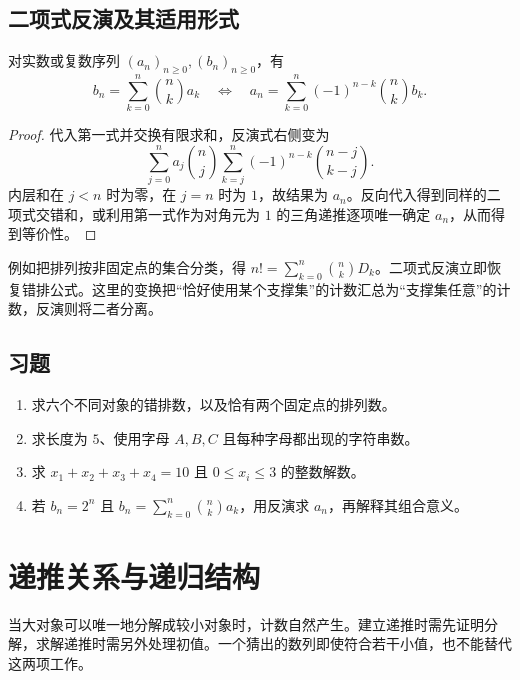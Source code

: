 \documentclass[UTF8,12pt,a4paper,fontset=fandol]{ctexbook}
\begin{document}
\section{二项式反演及其适用形式}

\begin{theorem}
对实数或复数序列 $(a_n)_{n\ge0},(b_n)_{n\ge0}$，有
\begin{equation}
  b_n=\sum_{k=0}^n\binom nk a_k
  \quad\Longleftrightarrow\quad
  a_n=\sum_{k=0}^n(-1)^{n-k}\binom nk b_k.
  \label{eq:binomial-inversion}
\end{equation}
\end{theorem}
\begin{proof}
代入第一式并交换有限求和，反演式右侧变为
\[
 \sum_{j=0}^n a_j\binom nj
 \sum_{k=j}^n(-1)^{n-k}\binom{n-j}{k-j}.
\]
内层和在 $j<n$ 时为零，在 $j=n$ 时为 $1$，故结果为 $a_n$。反向代入得到同样的二项式交错和，或利用第一式作为对角元为 $1$ 的三角递推逐项唯一确定 $a_n$，从而得到等价性。
\end{proof}

例如把排列按非固定点的集合分类，得 $n!=\sum_{k=0}^n\binom nkD_k$。二项式反演立即恢复错排公式。这里的变换把“恰好使用某个支撑集”的计数汇总为“支撑集任意”的计数，反演则将二者分离。

\section{习题}
\begin{enumerate}
  \item\label{ex:inclusion-exclusion-1} 求六个不同对象的错排数，以及恰有两个固定点的排列数。
  \item\label{ex:inclusion-exclusion-2} 求长度为 $5$、使用字母 $A,B,C$ 且每种字母都出现的字符串数。
  \item\label{ex:inclusion-exclusion-3} 求 $x_1+x_2+x_3+x_4=10$ 且 $0\le x_i\le3$ 的整数解数。
  \item\label{ex:inclusion-exclusion-4} 若 $b_n=2^n$ 且 $b_n=\sum_{k=0}^n\binom nk a_k$，用反演求 $a_n$，再解释其组合意义。
\end{enumerate}

\chapter{递推关系与递归结构}
\label{ch:recurrences}

当大对象可以唯一地分解成较小对象时，计数自然产生。建立递推时需先证明分解，求解递推时需另外处理初值。一个猜出的数列即使符合若干小值，也不能替代这两项工作。
\end{document}
